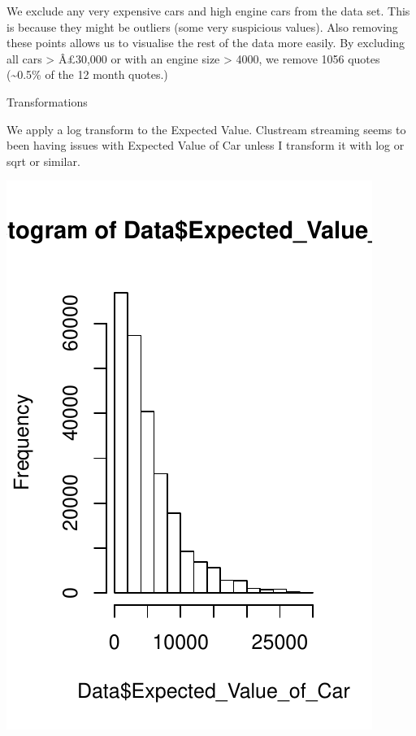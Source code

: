 We exclude any very expensive cars and high engine cars from the data
set. This is because they might be outliers (some very suspicious
values). Also removing these points allows us to visualise the rest of
the data more easily. By excluding all cars \textgreater{} Â£30,000 or
with an engine size \textgreater{} 4000, we remove 1056 quotes
(\textasciitilde{}0.5\% of the 12 month quotes.)

Transformations

We apply a log transform to the Expected Value. Clustream streaming
seems to been having issues with Expected Value of Car unless I
transform it with log or sqrt or similar.

\includegraphics{offline_regression_files/figure-latex/fighold-1.pdf}
